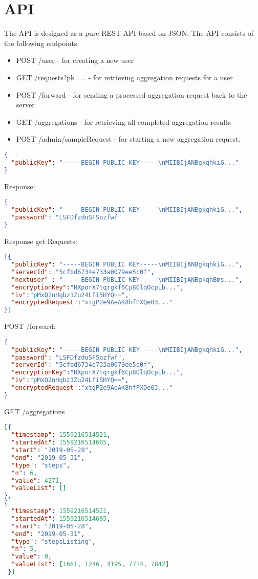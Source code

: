 \section{API}\label{api}
The API is designed as a pure REST API based on JSON.
The API consists of the following endpoints:
\begin{itemize}
	\item POST /user - for creating a new user
	\item GET /requests?pk=... - for retrieving aggregation requests for a user
	\item POST /forward - for sending a processed aggregation request back to the server
	\item GET /aggregations - for retrieving all completed aggregation results
	\item POST /admin/sampleRequest - for starting a new aggregation request.
\end{itemize}
\begin{lstlisting}[language=json,firstnumber=1]
{
  "publicKey": "-----BEGIN PUBLIC KEY-----\nMIIBIjANBgkqhkiG..."
}
\end{lstlisting}
Response:
\begin{lstlisting}[language=json,firstnumber=1]
{
  "publicKey": "-----BEGIN PUBLIC KEY-----\nMIIBIjANBgkqhkiG...",
  "password": "LSFDfzduSFSozfwf"
}
\end{lstlisting}
Response get Requests:
\begin{lstlisting}[language=json,firstnumber=1]
[{
  "publicKey": "-----BEGIN PUBLIC KEY-----\nMIIBIjANBgkqhkiG...",
  "serverId": "5cfbd6734e733a0079ee5c0f",
  "nextuser" : "-----BEGIN PUBLIC KEY-----\nMIIBIjANBgkqhBms...",
  "encryptionKey":"HXporX7tqrgkf6Cp8OlqOcpLb...",
  "iv":"pMxQ2nHqbz1Zu24Lfi5HYQ==",
  "encryptedRequest":"xtgP2e9AeAK8hfPXQe03..."
}]
\end{lstlisting}
POST /forward:
\begin{lstlisting}[language=json,firstnumber=1]
{
  "publicKey": "-----BEGIN PUBLIC KEY-----\nMIIBIjANBgkqhkiG...",
  "password": "LSFDfzduSFSozfwf",
  "serverId": "5cfbd6734e733a0079ee5c0f",
  "encryptionKey":"HXporX7tqrgkf6Cp8OlqOcpLb...",
  "iv":"pMxQ2nHqbz1Zu24Lfi5HYQ==",
  "encryptedRequest":"xtgP2e9AeAK8hfPXQe03..."
}
\end{lstlisting}
GET /aggregations
\begin{lstlisting}[language=json,firstnumber=1]
[{
  "timestamp": 1559216514521,
  "startedAt": 1559216514685,
  "start": "2019-05-28",
  "end": "2019-05-31",
  "type": "steps",
  "n": 6,
  "value": 4271,
  "valueList": []
},
{
  "timestamp": 1559216514521,
  "startedAt": 1559216514685,
  "start": "2019-05-28",
  "end": "2019-05-31",
  "type": "stepsListing",
  "n": 5,
  "value": 0,
  "valueList": [1661, 1246, 3195, 7714, 7842]
 }]
\end{lstlisting}

